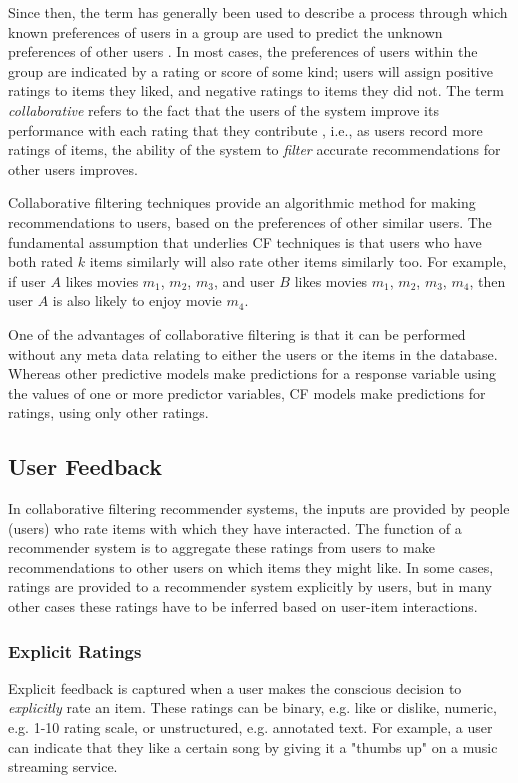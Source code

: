 Since then, the term has generally been used to describe a process through which known preferences of users in a group are used to predict the unknown preferences of other users \parencite{cf_1.1}. In most cases, the preferences of users within the group are indicated by a rating or score of some kind; users will assign positive ratings to items they liked, and negative ratings to items they did not. The term \textit{collaborative} refers to the fact that the users of the system improve its performance with each rating that they contribute \parencite{cf_1.2_eigentaste}, i.e., as users record more ratings of items, the ability of the system to \textit{filter} accurate recommendations for other users improves. 

Collaborative filtering techniques provide an algorithmic method for making recommendations to users, based on the preferences of other similar users. The fundamental assumption that underlies CF techniques is that users who have both rated $k$ items similarly will also rate other items similarly too. For example, if user $A$ likes movies $m_1$, $m_2$, $m_3$, and user $B$ likes movies $m_1$, $m_2$, $m_3$, $m_4$, then user $A$ is also likely to enjoy movie $m_4$. \parencite{cf_1.1}

One of the advantages of collaborative filtering is that it can be performed without any meta data relating to either the users or the items in the database. Whereas other predictive models make predictions for a response variable using the values of one or more predictor variables, CF models make predictions for ratings, using only other ratings. \parencite{handbook_1.1_intro}

\subsection{User Feedback}
 In collaborative filtering recommender systems, the inputs are provided by people (users) who rate items with which they have interacted. The function of a recommender system is to aggregate these ratings from users to make recommendations to other users on which items they might like. In some cases, ratings are provided to a recommender system explicitly by users, but in many other cases these ratings have to be inferred based on user-item interactions. 

\subsubsection{Explicit Ratings}
Explicit feedback is captured when a user makes the conscious decision to \textit{explicitly} rate an item. These ratings can be binary, e.g. like or dislike, numeric, e.g. 1-10 rating scale, or unstructured, e.g. annotated text. For example, a user can indicate that they like a certain song by giving it a "thumbs up" on a music streaming service.

